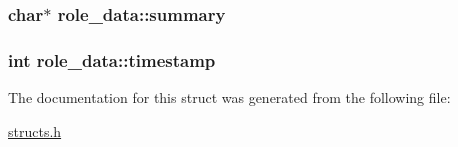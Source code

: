 \hypertarget{structrole__data_a2c9149ce91fbdf296bc7e6f5c1d49b74}{
\subsubsection[{summary}]{\setlength{\rightskip}{0pt plus 5cm}char$\ast$ role\-\_\-data\-::summary}}\label{structrole__data_a2c9149ce91fbdf296bc7e6f5c1d49b74}
\hypertarget{structrole__data_a98237a9e860e04d15ba7628144489622}{
\subsubsection[{timestamp}]{\setlength{\rightskip}{0pt plus 5cm}int role\-\_\-data\-::timestamp}}\label{structrole__data_a98237a9e860e04d15ba7628144489622}


The documentation for this struct was generated from the following file\-:\begin{DoxyCompactItemize}
\item 
\hyperlink{structs_8h}{structs.\-h}\end{DoxyCompactItemize}
